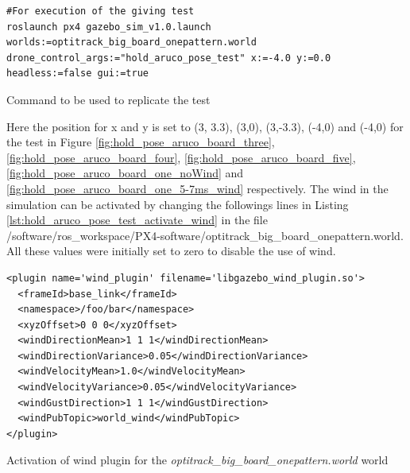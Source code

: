 \documentclass[../Head/report.tex]{subfiles}
\begin{document}
\begin{listing}[H] 
\begin{tcolorbox}[
    enhanced,
    attach boxed title to top left={xshift=6mm,yshift=-3mm},
    colback=lightgreen!20,
    colframe=lightgreen,
    fonttitle=\bfseries\color{black},
]
\begin{verbatim}
#For execution of the giving test
roslaunch px4 gazebo_sim_v1.0.launch worlds:=optitrack_big_board_onepattern.world drone_control_args:="hold_aruco_pose_test" x:=-4.0 y:=0.0 headless:=false gui:=true
\end{verbatim}
\end{tcolorbox}
\caption{Command to be used to replicate the test}
\label{lst:hold_aruco_pose_test}    
\end{listing} 

Here the position for x and y is set to (3, 3.3), (3,0), (3,-3.3), (-4,0) and (-4,0) for the test in Figure \ref{fig:hold_pose_aruco_board_three}, \ref{fig:hold_pose_aruco_board_four}, \ref{fig:hold_pose_aruco_board_five}, \ref{fig:hold_pose_aruco_board_one_noWind} and \ref{fig:hold_pose_aruco_board_one_5-7ms_wind} respectively. The wind in the simulation can be activated by changing the followings lines in Listing \ref{lst:hold_aruco_pose_test_activate_wind} in the file /software/ros\_workspace/PX4-software/optitrack\_big\_board\_onepattern.world. All these values were initially set to zero to disable the use of wind. 

\begin{listing}[H] 
\begin{tcolorbox}[
    enhanced,
    attach boxed title to top left={xshift=6mm,yshift=-3mm},
    colback=lightgreen!20,
    colframe=lightgreen,
    fonttitle=\bfseries\color{black},
]
\begin{verbatim}
<plugin name='wind_plugin' filename='libgazebo_wind_plugin.so'>
  <frameId>base_link</frameId>
  <namespace>/foo/bar</namespace>
  <xyzOffset>0 0 0</xyzOffset>
  <windDirectionMean>1 1 1</windDirectionMean>
  <windDirectionVariance>0.05</windDirectionVariance>
  <windVelocityMean>1.0</windVelocityMean>
  <windVelocityVariance>0.05</windVelocityVariance>
  <windGustDirection>1 1 1</windGustDirection>
  <windPubTopic>world_wind</windPubTopic>
</plugin>
\end{verbatim}
\end{tcolorbox}
\caption{Activation of wind plugin for the \textit{optitrack\_big\_board\_onepattern.world} world}
\label{lst:hold_aruco_pose_test_activate_wind}    
\end{listing} 
\end{document}
